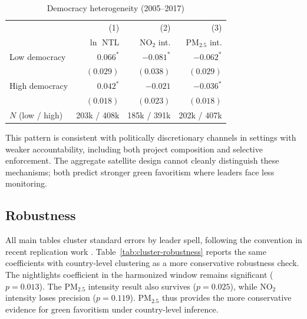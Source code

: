 \documentclass[9pt,twocolumn,twoside]{pnas-new}
\begin{document}
\begin{table}[t]
\centering
\caption{Democracy heterogeneity (2005--2017)}
\small
\begin{tabular*}{\columnwidth}{@{\extracolsep{\fill}}lrrr}
 & (1) & (2) & (3) \\
 & $\ln$ NTL & NO$_2$ int. & PM$_{2.5}$ int. \\
\midrule
Low democracy & $0.066^{*}$ & $-0.081^{*}$ & $-0.062^{*}$ \\
              & $(0.029)$   & $(0.038)$    & $(0.029)$ \\
High democracy & $0.042^{*}$ & $-0.021$ & $-0.036^{*}$ \\
               & $(0.018)$   & $(0.023)$ & $(0.018)$ \\
\midrule
$N$ (low / high) & 203k / 408k & 185k / 391k & 202k / 407k \\
\bottomrule
\end{tabular*}
\label{tab:democracy}
\end{table}

This pattern is consistent with politically discretionary channels in settings with weaker accountability, including both project composition and selective enforcement. The aggregate satellite design cannot cleanly distinguish these mechanisms; both predict stronger green favoritism where leaders face less monitoring.

\subsection*{Robustness}

All main tables cluster standard errors by leader spell, following the convention in recent replication work \cite{Bora2025}. Table~\ref{tab:cluster-robustness} reports the same coefficients with country-level clustering as a more conservative robustness check. The nightlights coefficient in the harmonized window remains significant ($p = 0.013$). The PM$_{2.5}$ intensity result also survives ($p = 0.025$), while NO$_2$ intensity loses precision ($p = 0.119$). PM$_{2.5}$ thus provides the more conservative evidence for green favoritism under country-level inference.
\end{document}
